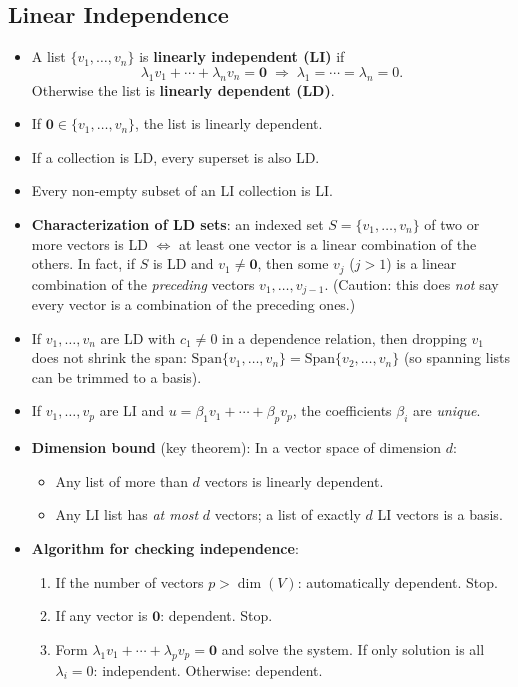 \documentclass[hidelinks]{article}
\begin{document}
\subsection{Linear Independence}
\begin{itemize}
    \item A list $\{v_1, \ldots, v_n\}$ is \textbf{linearly independent (LI)} if
    \[
        \lambda_1 v_1 + \cdots + \lambda_n v_n = \mathbf{0} \;\Longrightarrow\; \lambda_1 = \cdots = \lambda_n = 0.
    \]
    Otherwise the list is \textbf{linearly dependent (LD)}.
    \item If $\mathbf{0} \in \{v_1,\ldots,v_n\}$, the list is linearly dependent.
    \item If a collection is LD, every superset is also LD.
    \item Every non-empty subset of an LI collection is LI.
    \item \textbf{Characterization of LD sets}: an indexed set $S = \{v_1,\ldots,v_n\}$ of two or more vectors is LD $\iff$ at least one vector is a linear combination of the others. In fact, if $S$ is LD and $v_1\neq\mathbf 0$, then some $v_j$ ($j>1$) is a linear combination of the \emph{preceding} vectors $v_1,\ldots,v_{j-1}$. (Caution: this does \emph{not} say every vector is a combination of the preceding ones.)
    \item If $v_1,\ldots,v_n$ are LD with $c_1\neq 0$ in a dependence relation, then dropping $v_1$ does not shrink the span: $\mathrm{Span}\{v_1,\ldots,v_n\} = \mathrm{Span}\{v_2,\ldots,v_n\}$ (so spanning lists can be trimmed to a basis).
    \item If $v_1,\ldots,v_p$ are LI and $u = \beta_1 v_1 + \cdots + \beta_p v_p$, the coefficients $\beta_i$ are \emph{unique}.
    \item \textbf{Dimension bound} (key theorem): In a vector space of dimension $d$:
    \begin{itemize}
        \item Any list of more than $d$ vectors is linearly dependent.
        \item Any LI list has \emph{at most} $d$ vectors; a list of exactly $d$ LI vectors is a basis.
    \end{itemize}
    \item \textbf{Algorithm for checking independence}:
    \begin{enumerate}
        \item If the number of vectors $p > \dim(V)$: automatically dependent. Stop.
        \item If any vector is $\mathbf{0}$: dependent. Stop.
        \item Form $\lambda_1 v_1 + \cdots + \lambda_p v_p = \mathbf{0}$ and solve the system. If only solution is all $\lambda_i = 0$: independent. Otherwise: dependent.
    \end{enumerate}
\end{itemize}
\end{document}
